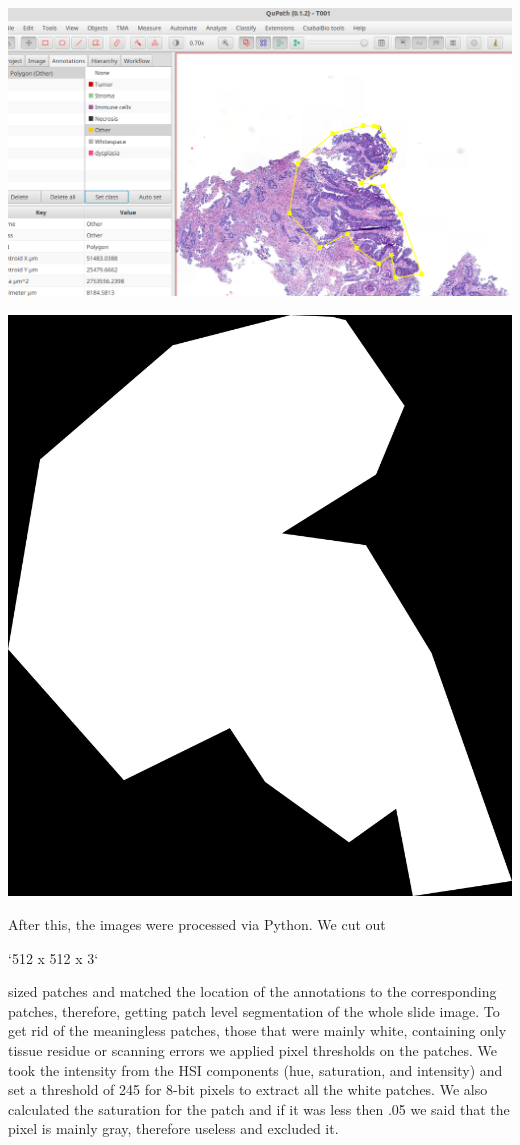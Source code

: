 \documentclass[a4paper,12pt]{article}
\begin{document}
\vspace{7mm}

\begin{minipage}[t]{0.4\textwidth}
    \centering
    \includegraphics[width=\linewidth]{qupath_screenshot.png}
    \label{fig:annotation_qupath}
\end{minipage}\qquad\qquad
\begin{minipage}[t]{0.4\textwidth}
    \centering
    \includegraphics[width=.5\linewidth]{T001_Other_(4.00,416425,200638,17047,19660)-mask.png}
    \label{fig:annotation}
\end{minipage}

\vspace{7mm}

\par After this, the images were processed via Python. We cut out \begin{markdown} 
`512 x 512 x 3`  
\end{markdown} 
sized patches and matched the location of the annotations to the corresponding patches, therefore, getting patch level segmentation of the whole slide image. To get rid of the meaningless patches, those that were mainly white, containing only tissue residue or scanning errors we applied pixel thresholds on the patches. We took the intensity from the HSI components (hue, saturation, and intensity) and set a threshold of 245 for 8-bit pixels to extract all the white patches. We also calculated the saturation for the patch and if it was less then .05 we said that the pixel is mainly gray, therefore useless and excluded it.
\end{document}
